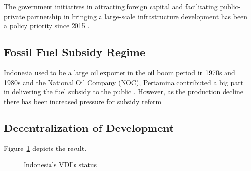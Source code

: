 \documentclass[letterpaper,12pt,leqno]{article}
\begin{document}
The government initiatives in attracting foreign capital and facilitating public-private partnership in bringing a large-scale infrastructure development has been a policy priority since 2015 \citep{pwc_2016}.

\subsection{Fossil Fuel Subsidy Regime}

Indonesia used to be a large oil exporter in the oil boom period in 1970s and 1980s and the National Oil Company (NOC), Pertamina contributed a big part in delivering the fuel subsidy to the public \citep{ichsan_2022}. However, as the production decline there has been increased pressure for subsidy reform

\subsection{Decentralization of Development}

Figure~\ref{f:graph1} depicts the result.


\begin{figure}[t]
\hfill
{}
\caption{Indonesia's VDI's status}
\label{f:graph1}\end{figure}
\end{document}

